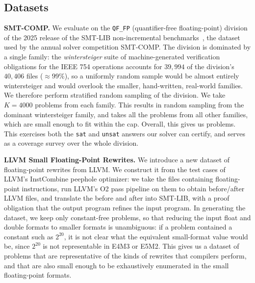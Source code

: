 \subsection{Datasets}

\noindent\textbf{SMT-COMP.}
We evaluate on the \texttt{QF\_FP} (quantifier-free floating-point) division of the
2025 release of the SMT-LIB non-incremental benchmarks~\cite{smtlib2025benchmarks},
the dataset used by the annual solver competition SMT-COMP.
The division is dominated by a single family: the \emph{wintersteiger} suite of
machine-generated verification obligations for the IEEE 754 operations accounts for
$39{,}994$ of the division's $40{,}406$ files ($\approx\!99\%$),
so a uniformly random sample would be almost entirely wintersteiger and would
overlook the smaller, hand-written, real-world families.
We therefore perform stratified random sampling of the division.
We take $K=4000$ problems from each family. This results in random sampling from the dominant wintersteiger family,
and takes all the problems from all other families, which are small enough to fit within the cap.
Overall, this gives us \SmtLibNumTotal{} problems.
This exercises both the \texttt{sat} and \texttt{unsat} answers our solver can certify,
and serves as a coverage survey over the whole division.

\noindent\textbf{LLVM Small Floating-Point Rewrites.}
We introduce a new dataset of \SmallFpNumTotal{} floating-point rewrites from LLVM.
We construct it from the test cases of LLVM's InstCombine peephole optimizer: we take the files
containing floating-point instructions, run LLVM's O2 pass pipeline on them to obtain before/after LLVM files,
and translate the before and after into SMT-LIB, with a proof obligation that the output program refines the input program.
In generating the dataset, we keep only constant-free problems, so that reducing the input float and double formats to smaller formats
is unambiguous: if a problem contained a constant such as $2^{20}$,
it is not clear what the equivalent small-format value would be, since $2^{20}$ is not representable in E4M3 or E5M2.
This gives us a dataset of problems that are representative of the kinds of
rewrites that compilers perform, and that are also small enough to be
exhaustively enumerated in the small floating-point formats.

